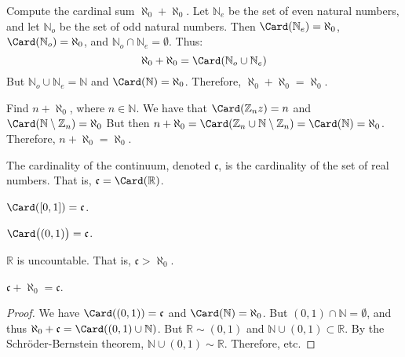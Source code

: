         \begin{example}
            Compute the cardinal sum $\aleph_{0}+\aleph_{0}$. Let
            $\mathbb{N}_{e}$ be the set of even natural numbers, and let
            $\mathbb{N}_{o}$ be the set of odd natural numbers. Then
            $\Card(\mathbb{N}_{e})=\aleph_{0}$,
            $\Card(\mathbb{N}_{o})=\aleph_{0}$, and
            ${\mathbb{N}_{o}}\cap{\mathbb{N}_{e}}=\emptyset$.
            Thus:
            \begin{equation}
                \aleph_{0}+\aleph_{0}
                =\Card({\mathbb{N}_{o}}\cup{\mathbb{N}_{e}})
            \end{equation}
            But ${\mathbb{N}_{o}}\cup{\mathbb{N}_{e}}=\mathbb{N}$ and
            $\Card(\mathbb{N})=\aleph_{0}$. Therefore,
            $\aleph_{0}+\aleph_{0}=\aleph_{0}$.
        \end{example}
        \begin{example}
            Find $n+\aleph_{0}$, where $n\in\mathbb{N}$.
            We have that
            $\Card(\mathbb{Z}_{n}z)=n$ and
            $\Card(\mathbb{N}\setminus\mathbb{Z}_{n})%
             =\aleph_{0}$
            But then
            $n+\aleph_{0}=%
             \Card(\mathbb{Z}_{n}\cup%
             \mathbb{N}\setminus\mathbb{Z}_{n})%
             =\Card(\mathbb{N})=\aleph_{0}$.
            Therefore, $n+\aleph_{0}=\aleph_{0}$.
        \end{example}
        \begin{definition}
            The cardinality of the continuum,
            denoted $\mathfrak{c}$, is the
            cardinality of the set of real numbers.
            That is, $\mathfrak{c}=\Card(\mathbb{R})$.
        \end{definition}
        \begin{theorem}
            $\Card([0,1])=\mathfrak{c}$.
        \end{theorem}
        \begin{theorem}
            $\Card\big((0,1)\big)=\mathfrak{c}$.
        \end{theorem}
        \begin{theorem}
            $\mathbb{R}$ is uncountable. That is,
            $\mathfrak{c}>\aleph_{0}$.
        \end{theorem}
        \begin{theorem}
            $\mathfrak{c}+\aleph_{0}=\mathfrak{c}$.
        \end{theorem}
        \begin{proof}
            We have $\Card((0,1))=\mathfrak{c}$ and
            $\Card(\mathbb{N})=\aleph_{0}$. But
            $(0,1)\cap\mathbb{N}=\emptyset$, and thus
            $\aleph_{0}+\mathfrak{c}%
             =\Card((0,1)\cup\mathbb{N})$.
            But $\mathbb{R}\sim(0,1)$ and
            $\mathbb{N}\cup(0,1)\subset\mathbb{R}$.
            By the Schr\"{o}der-Bernstein theorem,
            $\mathbb{N}\cup(0,1)\sim\mathbb{R}$.
            Therefore, etc.
        \end{proof}
